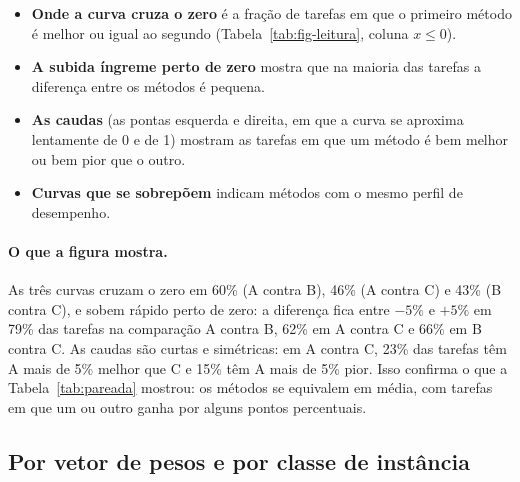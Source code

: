 \documentclass[11pt,a4paper]{article}
\begin{document}
\begin{itemize}[leftmargin=*]
  \item \textbf{Onde a curva cruza o zero} é a fração de tarefas em que o primeiro
  método é melhor ou igual ao segundo (Tabela~\ref{tab:fig-leitura}, coluna $x\le 0$).
  \item \textbf{A subida íngreme perto de zero} mostra que na maioria das tarefas a diferença
  entre os métodos é pequena.
  \item \textbf{As caudas} (as pontas esquerda e direita, em que a curva se aproxima lentamente
  de 0 e de 1) mostram as tarefas em que um método é bem melhor ou bem pior que o outro.
  \item \textbf{Curvas que se sobrepõem} indicam métodos com o mesmo perfil de desempenho.
\end{itemize}

\begin{table}[H]
  \centering
  \small
  
  \caption{Leitura numérica das curvas da Figura~\ref{fig:fo-diff} em $x=-5\%$, $0$, $+5\%$ e
  $+10\%$ (fração acumulada de tarefas). A coluna $x\le 0$ inclui empates.}
  \label{tab:fig-leitura}
\end{table}

\paragraph{O que a figura mostra.} As três curvas cruzam o zero em 60\% (A contra B),
46\% (A contra C) e 43\% (B contra C), e sobem rápido perto de zero: a diferença fica
entre $-5\%$ e $+5\%$ em 79\% das tarefas na comparação A contra B, 62\% em A contra C e
66\% em B contra C. As caudas são curtas e simétricas: em A contra C, 23\% das tarefas
têm A mais de 5\% melhor que C e 15\% têm A mais de 5\% pior. Isso confirma o que a
Tabela~\ref{tab:pareada} mostrou: os métodos se equivalem em média, com tarefas em que
um ou outro ganha por alguns pontos percentuais.

\subsection{Por vetor de pesos e por classe de instância}

\begin{table}[H]
  \centering
  \small
  
  \caption{FO média por vetor de pesos e por método, nas tarefas analisadas.}
  \label{tab:fo-peso}
\end{table}
\end{document}
